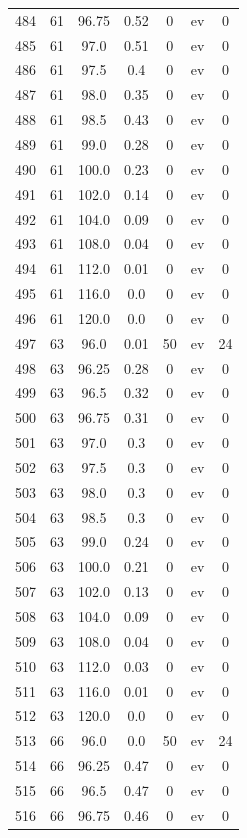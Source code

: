 \documentclass[12pt,a4paper]{article}
\begin{document}
\begin{tabular}{r|cccccc}
	484 & 61 & 96.75 & 0.52 & 0 & ev & 0 \\
	485 & 61 & 97.0 & 0.51 & 0 & ev & 0 \\
	486 & 61 & 97.5 & 0.4 & 0 & ev & 0 \\
	487 & 61 & 98.0 & 0.35 & 0 & ev & 0 \\
	488 & 61 & 98.5 & 0.43 & 0 & ev & 0 \\
	489 & 61 & 99.0 & 0.28 & 0 & ev & 0 \\
	490 & 61 & 100.0 & 0.23 & 0 & ev & 0 \\
	491 & 61 & 102.0 & 0.14 & 0 & ev & 0 \\
	492 & 61 & 104.0 & 0.09 & 0 & ev & 0 \\
	493 & 61 & 108.0 & 0.04 & 0 & ev & 0 \\
	494 & 61 & 112.0 & 0.01 & 0 & ev & 0 \\
	495 & 61 & 116.0 & 0.0 & 0 & ev & 0 \\
	496 & 61 & 120.0 & 0.0 & 0 & ev & 0 \\
	497 & 63 & 96.0 & 0.01 & 50 & ev & 24 \\
	498 & 63 & 96.25 & 0.28 & 0 & ev & 0 \\
	499 & 63 & 96.5 & 0.32 & 0 & ev & 0 \\
	500 & 63 & 96.75 & 0.31 & 0 & ev & 0 \\
	501 & 63 & 97.0 & 0.3 & 0 & ev & 0 \\
	502 & 63 & 97.5 & 0.3 & 0 & ev & 0 \\
	503 & 63 & 98.0 & 0.3 & 0 & ev & 0 \\
	504 & 63 & 98.5 & 0.3 & 0 & ev & 0 \\
	505 & 63 & 99.0 & 0.24 & 0 & ev & 0 \\
	506 & 63 & 100.0 & 0.21 & 0 & ev & 0 \\
	507 & 63 & 102.0 & 0.13 & 0 & ev & 0 \\
	508 & 63 & 104.0 & 0.09 & 0 & ev & 0 \\
	509 & 63 & 108.0 & 0.04 & 0 & ev & 0 \\
	510 & 63 & 112.0 & 0.03 & 0 & ev & 0 \\
	511 & 63 & 116.0 & 0.01 & 0 & ev & 0 \\
	512 & 63 & 120.0 & 0.0 & 0 & ev & 0 \\
	513 & 66 & 96.0 & 0.0 & 50 & ev & 24 \\
	514 & 66 & 96.25 & 0.47 & 0 & ev & 0 \\
	515 & 66 & 96.5 & 0.47 & 0 & ev & 0 \\
	516 & 66 & 96.75 & 0.46 & 0 & ev & 0 \\

\end{tabular}
\end{document}

